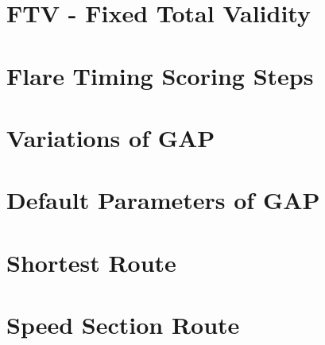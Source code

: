 \documentclass{article}
\begin{document}
\newpage
\section{FTV - Fixed Total Validity}


\newpage
\appendix
\appendixpage
\addappheadtotoc

\section{Flare Timing Scoring Steps}


\newpage
\section{Variations of GAP}


\newpage
\section{Default Parameters of GAP}


\newpage
\section{Shortest Route}


\newpage
\section{Speed Section Route}

\end{document}
